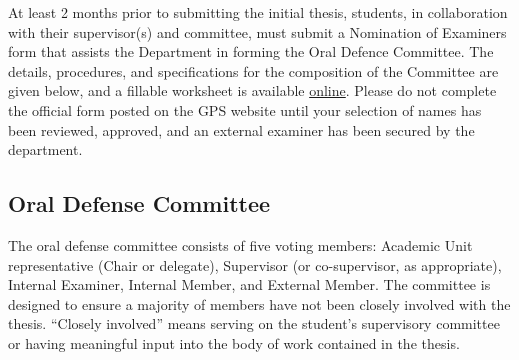 \documentclass[
  letterpaper,
  DIV=11,
  numbers=noendperiod]{scrreprt}
\begin{document}
At least 2 months prior to submitting the initial thesis, students, in
collaboration with their supervisor(s) and committee, must submit a
Nomination of Examiners form that assists the Department in forming the
Oral Defence Committee. The details, procedures, and specifications for
the composition of the Committee are given below, and a fillable
worksheet is available
\href{https://www.mcgill.ca/epi-biostat-occh/files/epi-biostat-occh/eboh_phd_nom_exam_worksheet_201911.docx}{online}.
Please do not complete the official form posted on the GPS website until
your selection of names has been reviewed, approved, and an external
examiner has been secured by the department.

\subsection{Oral Defense Committee}\label{oral-defense-committee}

The oral defense committee consists of five voting members: Academic
Unit representative (Chair or delegate), Supervisor (or co-supervisor,
as appropriate), Internal Examiner, Internal Member, and External
Member. The committee is designed to ensure a majority of members have
not been closely involved with the thesis. ``Closely involved'' means
serving on the student's supervisory committee or having meaningful
input into the body of work contained in the thesis.
\end{document}
